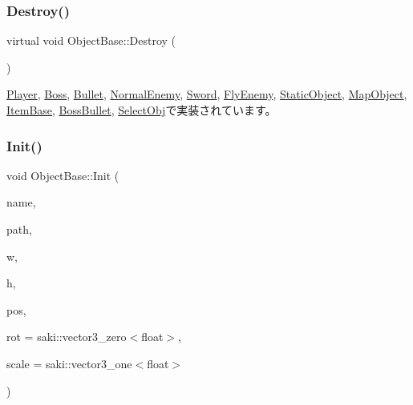 \mbox{\label{class_object_base_a7fa4c548153c3af20f89673ffea809af}} 
\subsubsection{\texorpdfstring{Destroy()}{Destroy()}}
{\footnotesize\ttfamily virtual void Object\+Base\+::\+Destroy (\begin{DoxyParamCaption}{ }\end{DoxyParamCaption})\hspace{0.3cm}{\ttfamily [pure virtual]}}



\mbox{\hyperlink{class_player_af2cf4936165ef12cce96f7994e0879df}{Player}}, \mbox{\hyperlink{class_boss_afe7a503ea624c30c2a50b58b40acfb48}{Boss}}, \mbox{\hyperlink{class_bullet_a09a92c6b924fb6bc38e18f6c41ac20ff}{Bullet}}, \mbox{\hyperlink{class_normal_enemy_a8a4271b6da6c7679d134d1c08125815b}{Normal\+Enemy}}, \mbox{\hyperlink{class_sword_a8473b694775374df4d9b6305cfa82293}{Sword}}, \mbox{\hyperlink{class_fly_enemy_af7ce5137e8eb2e8cc6654fbbdbc714cd}{Fly\+Enemy}}, \mbox{\hyperlink{class_static_object_a8e9fb321b4f8f12c4bec1bc66853512f}{Static\+Object}}, \mbox{\hyperlink{class_map_object_ad4bcfdc33bd945a9aa5e50a57c2704bc}{Map\+Object}}, \mbox{\hyperlink{class_item_base_ab34d53b8f3442da77466ba1b9132386e}{Item\+Base}}, \mbox{\hyperlink{class_boss_bullet_ace134e26eed55f3a839b8c6412664234}{Boss\+Bullet}}, \mbox{\hyperlink{class_select_obj_ad3a5fdc41a9e5753f99bae7ad289888f}{Select\+Obj}}で実装されています。

\mbox{\label{class_object_base_a72ec7737feab27edbf576ac1c796c5fe}} 
\subsubsection{\texorpdfstring{Init()}{Init()}}
{\footnotesize\ttfamily void Object\+Base\+::\+Init (\begin{DoxyParamCaption}\item[{std\+::string}]{name,  }\item[{W\+C\+H\+AR $\ast$}]{path,  }\item[{const float}]{w,  }\item[{const float}]{h,  }\item[{\mbox{\hyperlink{common_8h_ab1cb35b3a17c398d8ef71d5f779808bf}{Vec3}}}]{pos,  }\item[{\mbox{\hyperlink{common_8h_ab1cb35b3a17c398d8ef71d5f779808bf}{Vec3}}}]{rot = {\ttfamily saki\+:\+:vector3\+\_\+zero$<$float$>$},  }\item[{\mbox{\hyperlink{common_8h_ab1cb35b3a17c398d8ef71d5f779808bf}{Vec3}}}]{scale = {\ttfamily saki\+:\+:vector3\+\_\+one$<$float$>$} }\end{DoxyParamCaption})}



